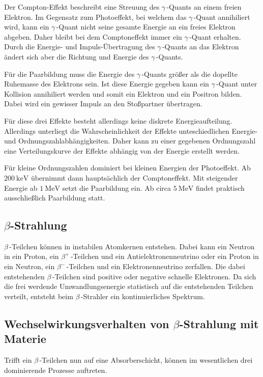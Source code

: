 Der Compton-Effekt beschreibt eine Streuung des $\gamma$\,-Quants an einem freien Elektron. Im Gegensatz zum Photoeffekt, bei welchem das $\gamma$\,-Quant annihiliert wird, kann ein 
$\gamma$\,-Quant nicht seine gesamte Energie an ein freies Elektron abgeben. Daher bleibt bei dem Comptoneffekt immer ein $\gamma$\,-Quant erhalten. Durch die Energie- und 
Impuls-Übertragung des $\gamma$\,-Quants an das Elektron ändert sich aber die Richtung und Energie des $\gamma$\,-Quants. 

Für die Paarbildung muss die Energie des $\gamma$\,-Quants größer als die dopellte Ruhemasse des Elektrons sein. Ist diese Energie gegeben kann ein $\gamma$\,-Quant unter 
Kollision annihiliert werden und somit ein Elektron und ein Positron bilden. Dabei wird ein gewisser Impuls an den Stoßpartner übertragen.

Für diese drei Effekte besteht allerdings keine diskrete Energieaufteilung. Allerdings unterliegt die Wahrscheinlichkeit der Effekte unteschiedlichen Energie- und 
Ordnungszahlabhängigkeiten. Daher kann zu einer gegebenen Ordnungszahl eine Verteilungskurve der Effekte abhängig von der Energie erstellt werden.

Für kleine Ordnungszahlen dominiert bei kleinen Energien der Photoeffekt. Ab $\qty{200}{\kilo\electronvolt}$ übernimmt dann hauptsächlich der Comptoneffekt. Mit steigender 
Energie ab $\qty{1}{\mega\electronvolt}$ setzt die Paarbildung ein. Ab circa $\qty{5}{\mega\electronvolt}$ findet praktisch ausschließlich Paarbildung statt.

\subsection{\texorpdfstring{$\beta$-Strahlung}{Beta-Strahlung}}
\label{subsec:Betastrahlung}
$\beta$\,-Teilchen können in instabilen Atomkernen entstehen. Dabei kann ein Neutron in ein Proton, ein $\beta^+$\,-Teilchen und ein Antielektronenneutrino oder
ein Proton in ein Neutron, ein $\beta^-$\,-Teilchen und ein Elektronenneutrino zerfallen. Die dabei entstehenden $\beta$\,-Teilchen sind positive oder negative schnelle
Elektronen. Da sich die frei werdende Umwandlungsenergie statistisch auf die entstehenden Teilchen verteilt, entsteht beim $\beta$\,-Strahler ein kontinuierliches Spektrum.

\subsection{\texorpdfstring{Wechselwirkungsverhalten von $\beta$-Strahlung mit Materie}{Wechselwirkungsverhalten von Beta-Strahlung mit Materie}}
\label{BetaWechselwirkung}
Trifft ein $\beta$\,-Teilchen nun auf eine Absorberschicht, können im wesentlichen drei dominierende Prozesse auftreten.


